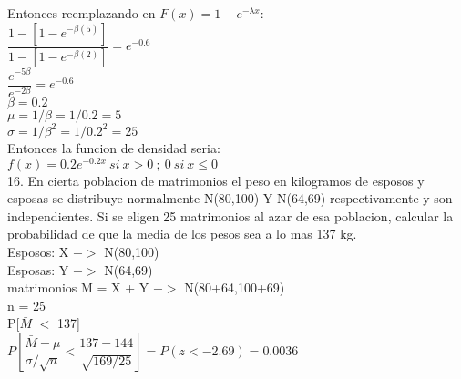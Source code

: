 \documentclass[12 pt,letterpaper]{article}
\begin{document}
\hspace{-0.7cm}Entonces reemplazando en $F(x) = 1-e^{-\lambda x}$:\\[2ex]

\hspace{-0.7cm}$\dfrac{1-[1-e^{- \beta (5)}]}{1-[1-e^{- \beta (2)}]} = e^{-0.6}$\\[2ex]
$\dfrac{e^{-5 \beta}}{e^{-2 \beta}} = e^{-0.6}$\\[2ex]

\hspace{-0.7cm}$\beta = 0.2$\\[2ex]
$\mu = 1/\beta = 1/0.2 = 5$\\[2ex]
$\sigma = 1/ \beta ^2 = 1/0.2^2 = 25$\\[2ex]

\hspace{-0.7cm}Entonces la funcion de densidad seria:\\[2ex]

\hspace{-0.7cm}$f(x) = 0.2e^{-0.2x} \ si \  x > 0 \  ; \  0 \  si \  x \le 0 $\\[30ex]

\hspace{-0.7cm}16. En cierta poblacion de matrimonios el peso en kilogramos de esposos y esposas se distribuye normalmente N(80,100) Y N(64,69) respectivamente y son independientes. Si se eligen 25 matrimonios al azar de esa poblacion, calcular la probabilidad de que la media de los pesos sea a lo mas 137 kg.\\[2ex]

\hspace{-0.7cm}Esposos: X $->$ N(80,100)\\[1ex]
Esposas: Y $->$ N(64,69)\\[1ex]
matrimonios M = X + Y $->$ N(80+64,100+69)\\[1ex]
n = 25\\[1ex]
P[$\bar{M}$ $<$ 137]\\[1ex]
$P[\dfrac{\bar{M} - \mu}{\sigma / \sqrt{n}} < \dfrac{137-144}{\sqrt{169/25}}] = P(z < -2.69) = 0.0036 $\\[2ex]
\end{document}
